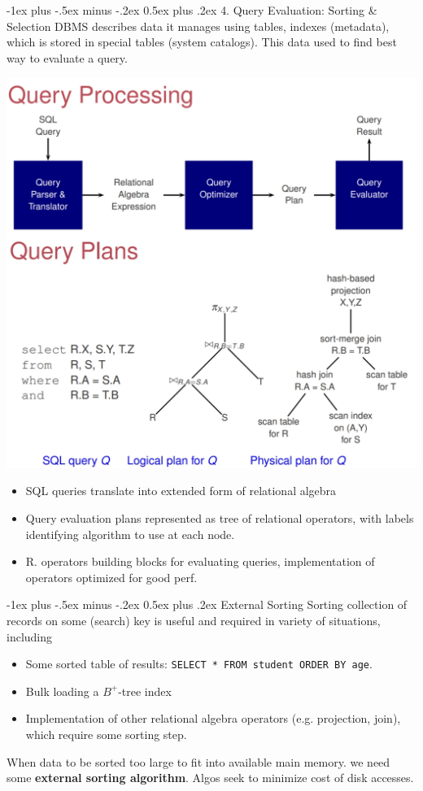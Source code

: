 \documentclass[10pt, landscape]{article}
\makeatletter
\renewcommand{\section}{\@startsection{section}{1}{0mm}%
                                {-1ex plus -.5ex minus -.2ex}%
                                {0.5ex plus .2ex}%
                                {\normalfont\large\bfseries}}
\newcommand{\code}[1]{\colorbox{gray!25!}{\lstinline|#1|}}
\makeatother
\begin{document}
\begin{multicols*}{3}
\section{4. Query Evaluation: Sorting \& Selection}
DBMS describes data it manages using tables, indexes (metadata), which is stored in special tables (system catalogs). This data used to find best way to evaluate a query.
\centerline{\includegraphics[width = 0.8\linewidth]{queryProcessing}}
\begin{itemize}
\item SQL queries translate into extended form of relational algebra
\item Query evaluation plans represented as tree of relational operators, with labels identifying algorithm to use at each node.
\item R. operators building blocks for evaluating queries, implementation of operators optimized for good perf.
\end{itemize}

\section{External Sorting}
Sorting collection of records on some (search) key is useful and required in variety of situations, including 
\begin{itemize}
\item Some sorted table of results: \code{SELECT * FROM student ORDER BY age}.
\item Bulk loading a $B^+$-tree index
\item Implementation of other relational algebra operators (e.g. projection, join), which require some sorting step.
\end{itemize}
When data to be sorted too large to fit into available main memory. we need some \textbf{external sorting algorithm}. Algos seek to minimize cost of disk accesses.


\end{multicols*}
\end{document}

